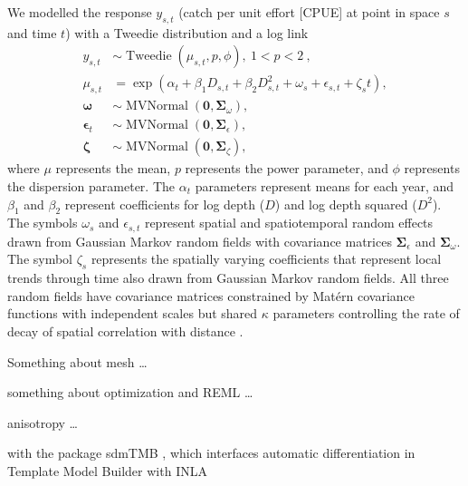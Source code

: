 \documentclass[12pt]{article}
\title{}
\author{}
\date{} %
\begin{document}
We modelled the response $y_{s,t}$ (catch per unit effort [CPUE] at point in space $s$ and time $t$) with a Tweedie distribution and a log link \citep{tweedie1984, dunn2005, anderson2019synopsis}
\begin{align}
  y_{s,t} &\sim \operatorname{Tweedie} \left(\mu_{s,t}, p, \phi \right), \: 1 < p < 2\ ,\\
  \mu_{s,t} &= \exp 
  \left(\alpha_t + \beta_1 D_{s,t} + \beta_2 D_{s,t}^2 + \omega_s + \epsilon_{s,t}  + \zeta_s t \right),\\
  \bm{\omega} &\sim \operatorname{MVNormal} \left( \bm{0}, \bm{\Sigma}_\omega \right),\\
  \bm{\epsilon}_t &\sim \operatorname{MVNormal} \left( \bm{0}, \bm{\Sigma}_{\epsilon} \right),\\
   \bm{\zeta} &\sim \operatorname{MVNormal} \left( \bm{0}, \bm{\Sigma}_\zeta \right),
\end{align}
where $\mu$ represents the mean, $p$ represents the power parameter, and $\phi$ represents the dispersion parameter.
The $\alpha_t$ parameters represent means for each year, and $\beta_{1}$ and $\beta_{2}$ represent coefficients for log depth ($D$) and log depth squared ($D^2$).
The symbols $\omega_s$ and $\epsilon_{s,t}$ represent spatial and spatiotemporal random effects drawn from Gaussian Markov random fields \citep{cressie2011} with covariance matrices $\bm{\Sigma}_{\epsilon}$ and $\bm{\Sigma}_\omega$.
The symbol $\zeta_s$ represents the spatially varying coefficients that represent local trends through time also drawn from Gaussian Markov random fields.
All three random fields have covariance matrices constrained by Mat\'ern covariance functions \citep{cressie2011} with independent scales but shared $\kappa$ parameters controlling the rate of decay of spatial correlation with distance \citep{cressie2011}.

Something about mesh \citep{rue2009, lindgren2011} \ldots 

something about optimization and REML \ldots

anisotropy \ldots

with the package sdmTMB \citep{anderson2019synopsis, sdmTMB}, which interfaces automatic differentiation in Template Model Builder \citep{kristensen2016} with INLA \citep{rue2009}


\end{document}
